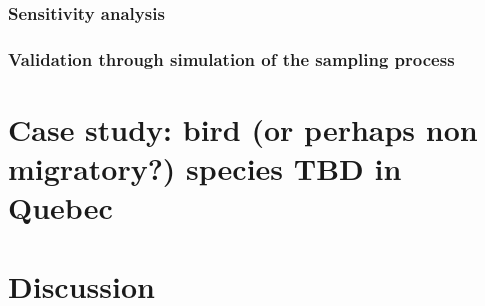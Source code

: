 \documentclass[11pt]{article}
\begin{document}
\hypertarget{sensitivity-analysis}{%
\subsubsection{Sensitivity analysis}\label{sensitivity-analysis}}

\hypertarget{validation-through-simulation-of-the-sampling-process}{%
\subsubsection{Validation through simulation of the sampling
process}\label{validation-through-simulation-of-the-sampling-process}}

\hypertarget{case-study-bird-or-perhaps-non-migratory-species-tbd-in-quebec}{%
\section{Case study: bird (or perhaps non migratory?) species TBD in
Quebec}\label{case-study-bird-or-perhaps-non-migratory-species-tbd-in-quebec}}

\hypertarget{discussion}{%
\section{Discussion}\label{discussion}}
\end{document}
